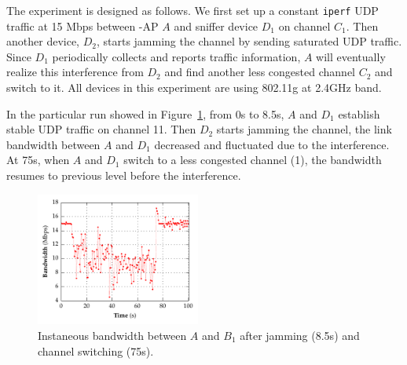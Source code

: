 The experiment is designed as follows. We first set up a constant \texttt{iperf}
UDP traffic at 15 Mbps between \PS{}-AP $A$ and sniffer device $D_1$ on channel
$C_1$. Then another device, $D_2$, starts jamming the channel by sending
saturated UDP traffic. Since $D_1$ periodically collects and reports traffic
information, $A$ will eventually realize this interference from $D_2$ and find
another less congested channel $C_2$ and switch to it. All devices in this
experiment are using 802.11g at 2.4GHz band. 

In the particular run showed in Figure~\ref{fig:bw}, from 0s to 8.5s, $A$ and
$D_1$ establish stable UDP traffic on channel 11. Then $D_2$ starts jamming the
channel, the link bandwidth between $A$ and $D_1$ decreased and fluctuated due
to the interference. At 75s, when $A$ and $D_1$ switch to a less congested
channel (1), the bandwidth resumes to previous level before the interference.

\begin{figure}[t!]
  \centering
  \includegraphics[width=0.48\textwidth]{./figures/ChannelBWGraph.pdf}
  \caption{Instaneous bandwidth between $A$ and $B_1$ after jamming (8.5s) and
  channel switching (75s).}
  \label{fig:bw}
\end{figure}
